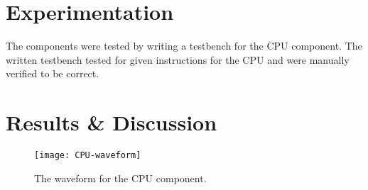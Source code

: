 \documentclass[11pt]{report}
\begin{document}
\section*{Experimentation}
The components were tested by writing a testbench for the CPU component. The written testbench 
tested for given instructions for the CPU and were manually verified to be correct.

\section*{Results \& Discussion}
\begin{figure}[h!]
    \centering
    \texttt{[image: CPU-waveform]}
    \caption{The waveform for the CPU component.}
    \label{fig:CPU-waveform}
\end{figure}
\end{document}
